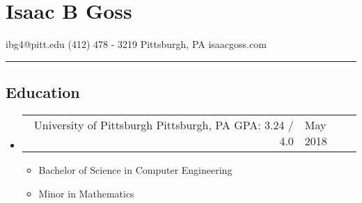 \documentclass[18pt]{article}
\makeatletter
\providecommand{\tightlist}{
    \setlength{\itemsep}{0pt}\setlength{\parskip}{0pt}
}
\providecommand{\datetable}[2]{
    \begin{tabular*}{\textwidth}{r @{\extracolsep{\fill}} l}
        #1 & #2
    \end{tabular*}
}
\makeatother
\begin{document}
  \section*{Isaac B Goss}\label{isaac-b-goss}
    ibg4@pitt.edu \textbar{} (412) 478 - 3219 \textbar{} Pittsburgh, PA \textbar{} isaacgoss.com
    
    \hrule
    
    \subsection*{Education}\label{education}      
      \begin{itemize}\tightlist
        \item \datetable{University of Pittsburgh \textbar{} Pittsburgh, PA \textbar{} GPA: 3.24 / 4.0}{May 2018}
        \begin{itemize}\tightlist
          \item Bachelor of Science in Computer Engineering
          \item Minor in Mathematics
        \end{itemize}
      \end{itemize}
      
\end{document}
